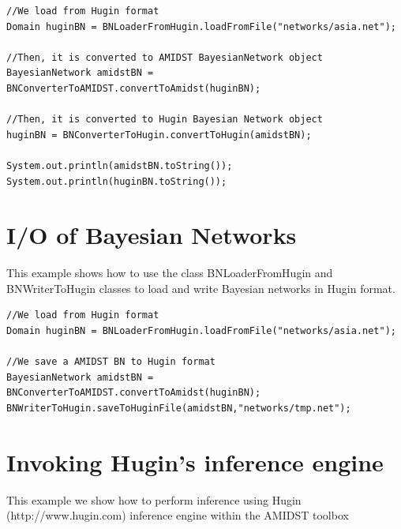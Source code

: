 \begin{lstlisting}
//We load from Hugin format
Domain huginBN = BNLoaderFromHugin.loadFromFile("networks/asia.net");

//Then, it is converted to AMIDST BayesianNetwork object
BayesianNetwork amidstBN = BNConverterToAMIDST.convertToAmidst(huginBN);

//Then, it is converted to Hugin Bayesian Network object
huginBN = BNConverterToHugin.convertToHugin(amidstBN);

System.out.println(amidstBN.toString());
System.out.println(huginBN.toString());
\end{lstlisting}



\section{I/O of Bayesian Networks}

This example shows how to use the class BNLoaderFromHugin and BNWriterToHugin classes to load and
write Bayesian networks in Hugin format.

\begin{lstlisting}
//We load from Hugin format
Domain huginBN = BNLoaderFromHugin.loadFromFile("networks/asia.net");

//We save a AMIDST BN to Hugin format
BayesianNetwork amidstBN = BNConverterToAMIDST.convertToAmidst(huginBN);
BNWriterToHugin.saveToHuginFile(amidstBN,"networks/tmp.net");
\end{lstlisting}

\section{Invoking Hugin's inference engine}

This example we show how to perform inference using Hugin (http://www.hugin.com) inference engine within the AMIDST toolbox

